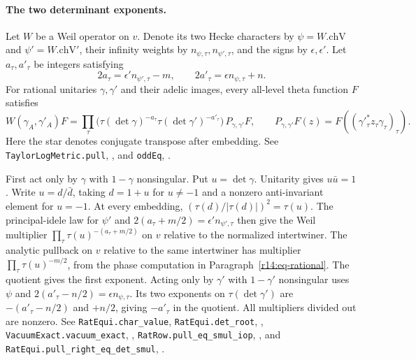\paragraph{The two determinant exponents.}\label{r15:rational-weights}
Let $W$ be a Weil operator on $v$. Denote its two Hecke characters
by $\psi=W.\mathrm{chV}$ and $\psi'=W.\mathrm{chV}'$, their infinity weights
by $n_{\psi,\tau},n_{\psi',\tau}$, and the signs by $\epsilon,\epsilon'$.
Let $a_\tau,a'_\tau$ be integers satisfying
\[
 2a_\tau=\epsilon' n_{\psi',\tau}-m,\qquad
 2a'_\tau=\epsilon n_{\psi,\tau}+n .
\]
For rational unitaries $\gamma,\gamma'$ and their adelic images, every
all-level theta function $F$ satisfies
\[
 W(\gamma_A,\gamma'_A)F
 = \prod_\tau\bigl(\tau(\det\gamma)^{-a_\tau}
                      \tau(\det\gamma')^{-a'_\tau}\bigr)\,
 P_{\gamma,\gamma'}F,
 \qquad
 P_{\gamma,\gamma'}F(z)=F((\gamma'^*_\tau z_\tau\gamma_\tau)_\tau).
\]
Here the star denotes conjugate transpose after embedding.
See \nolinkurl{TaylorLogMetric.pull},
,
and \nolinkurl{oddEq}, .

First act only by $\gamma$ with $1-\gamma$ nonsingular. Put $u=\det\gamma$.
Unitarity gives $u\bar u=1$. Write $u=d/\bar d$, taking $d=1+u$ for
$u\ne-1$ and a nonzero anti-invariant element for $u=-1$. At every
embedding, $(\tau(d)/|\tau(d)|)^2=\tau(u)$. The principal-idele law for
$\psi'$ and $2(a_\tau+m/2)=\epsilon'n_{\psi',\tau}$ then give the Weil
multiplier $\prod_\tau\tau(u)^{-(a_\tau+m/2)}$ on $v$ relative to the
normalized intertwiner. The analytic pullback on $v$ relative to the
same intertwiner has multiplier $\prod_\tau\tau(u)^{-m/2}$, from the
phase computation in Paragraph~\ref{r14:eq-rational}. The quotient gives
the first exponent. Acting only by $\gamma'$ with $1-\gamma'$ nonsingular
uses $\psi$ and $2(a'_\tau-n/2)=\epsilon n_{\psi,\tau}$. Its two
exponents on $\tau(\det\gamma')$ are $-(a'_\tau-n/2)$ and $+n/2$,
giving $-a'_\tau$ in the quotient. All multipliers divided out are nonzero.
See \nolinkurl{RatEqui.char_value}, \nolinkurl{RatEqui.det_root},
,
\nolinkurl{VacuumExact.vacuum_exact}, ,
\nolinkurl{RatRow.pull_eq_smul_iop}, ,
and \nolinkurl{RatEqui.pull_right_eq_det_smul},
.

